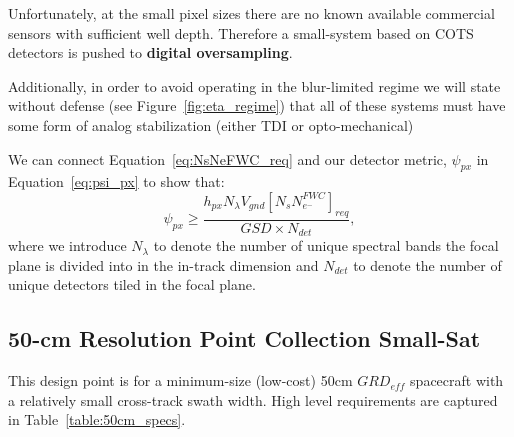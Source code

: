 \documentclass[]{spieman}  %
\begin{document}
Unfortunately, at the small pixel sizes there are no known available commercial sensors with sufficient well depth. Therefore a small-system based on COTS detectors is pushed to \textbf{digital oversampling}.  

Additionally, in order to avoid operating in the blur-limited regime we will state without defense (see Figure~\ref{fig:eta_regime}) that all of these systems must have some form of analog stabilization (either TDI or opto-mechanical)

We can connect Equation~\eqref{eq:NsNeFWC_req} and our detector metric, $\psi_{px}$ in Equation~\eqref{eq:psi_px} to show that:
\begin{equation}
    \psi_{px} \geq \frac{h_{px} N_{\lambda} V_{gnd} \left[N_sN_{e^-}^{FWC}\right]_{req}}{GSD \times N_{det}}
    \label{eq:psi_px_req},
\end{equation}
where we introduce $N_{\lambda}$ to denote the number of unique spectral bands the focal plane is divided into in the in-track dimension and $N_{det}$ to denote the number of unique detectors tiled in the focal plane.

\subsection{50-cm Resolution Point Collection Small-Sat}

This design point is for a minimum-size (low-cost) 50cm $GRD_{eff}$ spacecraft with a relatively small cross-track swath width.  High level requirements are captured in Table~\ref{table:50cm_specs}.

\begin{table}[ht]
\centering
{}
\caption{Specification for 50-cm small-sat point collector.}
\label{table:50cm_specs}
\end{table}
\end{document}
